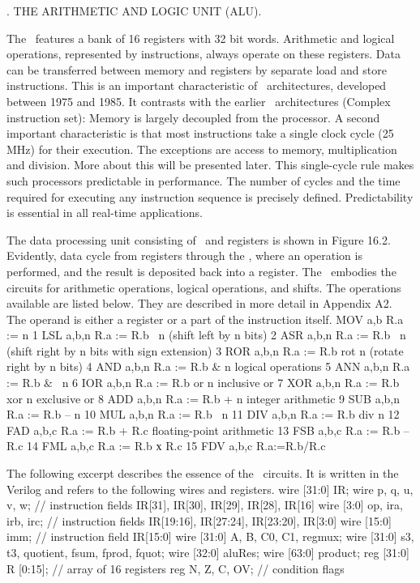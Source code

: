. THE ARITHMETIC AND LOGIC UNIT (ALU).

The \ALU\ features a bank of 16 registers with 32 bit words. Arithmetic and logical operations, represented by instructions, always operate on these registers. Data can be transferred between memory and registers by separate load and store instructions. This is an important characteristic of \RISC\ architectures, developed between 1975 and 1985. It contrasts with the earlier \CISC\ architectures (Complex instruction set): Memory is largely decoupled from the processor. A second important characteristic is that most instructions take a single clock cycle (25 MHz) for their execution. The exceptions are access to memory, multiplication and division. More about this will be presented later. This single-cycle rule makes such processors predictable in performance. The number of cycles and the time required for executing any instruction sequence is precisely defined. Predictability is essential in all real-time applications.

The data processing unit consisting of \ALU\ and registers is shown in Figure 16.2. Evidently, data cycle from registers through the \ALU, where an operation is performed, and the result is deposited back into a register. The \ALU\ embodies the circuits for arithmetic operations, logical operations, and shifts. The operations available are listed below. They are described in more detail in Appendix A2. The operand  is either a register or a part of the instruction itself.
 MOV a,b    R.a := n  
 1 LSL a,b,n  R.a := R.b \leftarrow\ n   (shift left by n bits)
 2 ASR a,b,n  R.a := R.b \rightarrow\ n   (shift right by n bits with sign extension)
 3 ROR a,b,n  R.a := R.b rot n   (rotate right by n bits)
 4 AND a,b,n  R.a := R.b $\&$ n   logical operations
 5 ANN a,b,n  R.a := R.b $\&$ ~n  
 6 IOR a,b,n  R.a := R.b or n   inclusive or
 7 XOR a,b,n  R.a := R.b xor n   exclusive or
 8 ADD a,b,n  R.a := R.b + n   integer arithmetic
 9 SUB a,b,n  R.a := R.b – n   
10 MUL a,b,n  R.a := R.b \times\ n   
11 DIV a,b,n  R.a := R.b div n   
12 FAD a,b,c  R.a := R.b + R.c floating-point arithmetic   
13 FSB a,b,c  R.a := R.b – R.c   
14 FML a,b,c  R.a := R.b х R.c   
15 FDV a,b,c  R.a:=R.b/R.c   
\endtt

The following excerpt describes the essence of the \ALU\ circuits. It is written in the  Verilog and refers to the following wires and registers.
\begintt
wire [31:0] IR;
wire p, q, u, v, w; // instruction fields IR[31], IR[30], IR[29], IR[28], IR[16]
wire [3:0] op, ira, irb, irc; // instruction fields IR[19:16], IR[27:24], IR[23:20], IR[3:0]
wire [15:0] imm; // instruction field IR[15:0]
wire [31:0] A, B, C0, C1, regmux;
wire [31:0] s3, t3, quotient, fsum, fprod, fquot;
wire [32:0] aluRes;
wire [63:0] product;
reg [31:0] R [0:15]; // array of 16 registers
reg N, Z, C, OV; // condition flags
\endtt


